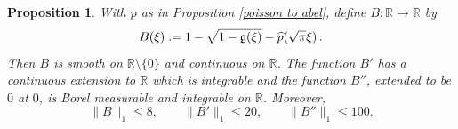 \documentclass[12pt,reqno]{amsart}
\theoremstyle{plain}
\newtheorem{proposition}[theorem]{Proposition}
\numberwithin{equation}{section}
\theoremstyle{remark}
\newcommand{\R}{{\mathbb R}}
\begin{document}
\begin{proposition}\label{auxiliary function B}
    With $p$ as in Proposition \ref{poisson to abel}, define $B:\R\to \R$ by
\begin{equation}\label{auto:Gaussian-square-root-remainder}
    B(\xi):=1-\sqrt{1-\mathfrak{g}(\xi)}-\widehat{p}(\sqrt{\pi}\xi)\, .
\end{equation}
Then $B$ is smooth on $\R\setminus \{0\}$ and continuous on $\R$. The function $B'$
has a continuous extension to $\R$ which is integrable and the
function $B''$, extended to be $0$ at $0$, is Borel measurable and integrable on $\R$.
Moreover,
\begin{equation}\label{eq:B-explicit-norms}
    \|B\|_1\le 8,\qquad
    \|B'\|_1\le 20,\qquad
    \|B''\|_1\le 100.
\end{equation}
\end{proposition}
\end{document}
